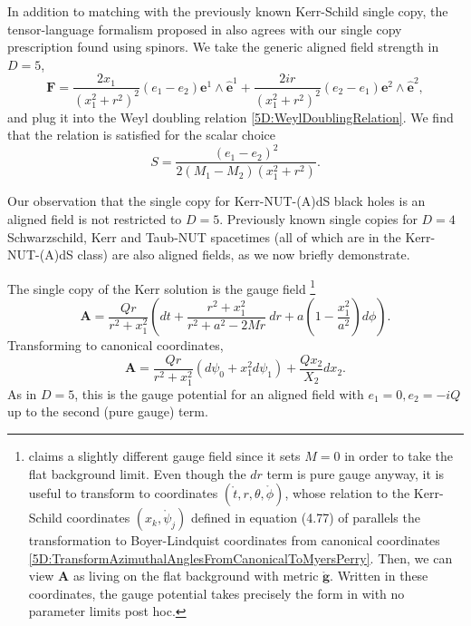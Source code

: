 In addition to matching with the previously known Kerr-Schild single copy, the tensor-language formalism proposed
in \cite{Alawadhi:2020jrv} also agrees with our single copy prescription found using spinors. We take the generic aligned field strength in $D = 5$, 
%
\begin{equation} 
    \mathbf{F} = \frac{2x_{1}}{(x_{1}^{2} + r^{2})^{2}}(e_{1} - e_{2}) \mathbf{e}^{1} \wedge \mathbf{\hat{e}}^{1} +
    \frac{2ir}{(x_{1}^{2} + r^{2})^{2}} (e_{2} - e_{1}) \mathbf{e}^{2} \wedge \mathbf{\hat{e}}^{2},
\end{equation}
%
and plug it into the Weyl doubling relation \eqref{5D:WeylDoublingRelation}. We find that the relation is
satisfied for the scalar choice
%
\begin{equation} 
    S = \frac{(e_{1} - e_{2})^{2}}{2(M_{1} - M_{2})(x_{1}^{2} + r^{2})}.
\end{equation}

Our observation that the single copy for Kerr-NUT-(A)dS black holes is an aligned field is not restricted to $D  =
5$. Previously known single copies for $D = 4$ Schwarzschild, Kerr and Taub-NUT spacetimes\cite{Monteiro:2014cda,
Luna:2018dpt, Luna:2015paa} (all of which are in the Kerr-NUT-(A)dS class) are also aligned fields, as we
now briefly demonstrate.

The single copy of the Kerr solution is the gauge field \cite{Luna:2018dpt}%
%
\footnote{\cite{Luna:2018dpt} claims a slightly different gauge
    field since it sets $M = 0$ in order to take the flat background limit. Even though the $dr$ term is pure
    gauge anyway, it is useful to transform to coordinates $(\mathring{t}, r, \theta,
    \mathring{\phi})$, whose relation to the Kerr-Schild coordinates $(x_{k},
    \mathring{\psi}_{j})$ defined in equation (4.77) of
    \cite{Frolov:2017kze} parallels the transformation to Boyer-Lindquist coordinates from canonical
    coordinates \eqref{5D:TransformAzimuthalAnglesFromCanonicalToMyersPerry}. Then, we can 
   view $\mathbf{A}$ as living on the flat background with metric
$\mathbf{\mathring{g}}$.
Written in these coordinates, the gauge potential takes precisely the form in \cite{Luna:2018dpt} with no parameter
limits post hoc.}
%
\begin{equation} 
    \mathbf{A} = \frac{Qr}{r^{2} + x_{1}^{2}} \left(dt + \frac{r^{2}+x_{1}^{2}}{r^{2} + a^{2} - 2Mr}\ dr + a\left( 1
    - \frac{x_{1}^{2}}{a^{2}}\right) d\phi\right).
\end{equation}
%
Transforming to canonical coordinates, 
%
\begin{equation} 
    \mathbf{A} = \frac{Qr}{r^{2} + x_{1}^{2}} \left(d\psi_{0} + x_{1}^{2} d\psi_{1}\right) +
    \frac{Qx_{2}}{X_{2}}
    dx_{2}.
\end{equation}
%
As in $D = 5$, this is the gauge potential for an aligned field with $e_{1} = 0, e_{2} = - i Q$ up to the second
(pure gauge) term.

